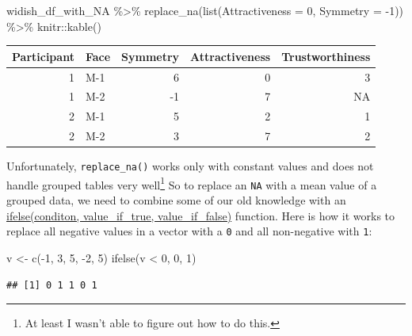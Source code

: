 \documentclass[
]{book}
\newenvironment{Shaded}{\begin{snugshade}}{\end{snugshade}}
\newcommand{\AttributeTok}[1]{\textcolor[rgb]{0.77,0.63,0.00}{#1}}
\newcommand{\DecValTok}[1]{\textcolor[rgb]{0.00,0.00,0.81}{#1}}
\newcommand{\FunctionTok}[1]{\textcolor[rgb]{0.00,0.00,0.00}{#1}}
\newcommand{\NormalTok}[1]{#1}
\newcommand{\OtherTok}[1]{\textcolor[rgb]{0.56,0.35,0.01}{#1}}
\newcommand{\SpecialCharTok}[1]{\textcolor[rgb]{0.00,0.00,0.00}{#1}}
\begin{document}
\begin{Shaded}
\begin{Highlighting}[]
\NormalTok{widish\_df\_with\_NA }\SpecialCharTok{\%\textgreater{}\%}
  \FunctionTok{replace\_na}\NormalTok{(}\FunctionTok{list}\NormalTok{(}\AttributeTok{Attractiveness =} \DecValTok{0}\NormalTok{, }\AttributeTok{Symmetry =} \SpecialCharTok{{-}}\DecValTok{1}\NormalTok{)) }\SpecialCharTok{\%\textgreater{}\%}
\NormalTok{  knitr}\SpecialCharTok{::}\FunctionTok{kable}\NormalTok{()}
\end{Highlighting}
\end{Shaded}

\begin{tabular}{r|l|r|r|r}
\hline
Participant & Face & Symmetry & Attractiveness & Trustworthiness\\
\hline
1 & M-1 & 6 & 0 & 3\\
\hline
1 & M-2 & -1 & 7 & NA\\
\hline
2 & M-1 & 5 & 2 & 1\\
\hline
2 & M-2 & 3 & 7 & 2\\
\hline
\end{tabular}

Unfortunately, \texttt{replace\_na()} works only with constant values and does not handle grouped tables very well\footnote{At least I wasn't able to figure out how to do this.} So to replace an \texttt{NA} with a mean value of a grouped data, we need to combine some of our old knowledge with an \href{https://stat.ethz.ch/R-manual/R-devel/library/base/html/ifelse.html}{ifelse(conditon, value\_if\_true, value\_if\_false)} function. Here is how it works to replace all negative values in a vector with a \texttt{0} and all non-negative with \texttt{1}:

\begin{Shaded}
\begin{Highlighting}[]
\NormalTok{v }\OtherTok{\textless{}{-}} \FunctionTok{c}\NormalTok{(}\SpecialCharTok{{-}}\DecValTok{1}\NormalTok{, }\DecValTok{3}\NormalTok{, }\DecValTok{5}\NormalTok{, }\SpecialCharTok{{-}}\DecValTok{2}\NormalTok{, }\DecValTok{5}\NormalTok{)}
\FunctionTok{ifelse}\NormalTok{(v }\SpecialCharTok{\textless{}} \DecValTok{0}\NormalTok{, }\DecValTok{0}\NormalTok{, }\DecValTok{1}\NormalTok{)}
\end{Highlighting}
\end{Shaded}

\begin{verbatim}
## [1] 0 1 1 0 1
\end{verbatim}
\end{document}
